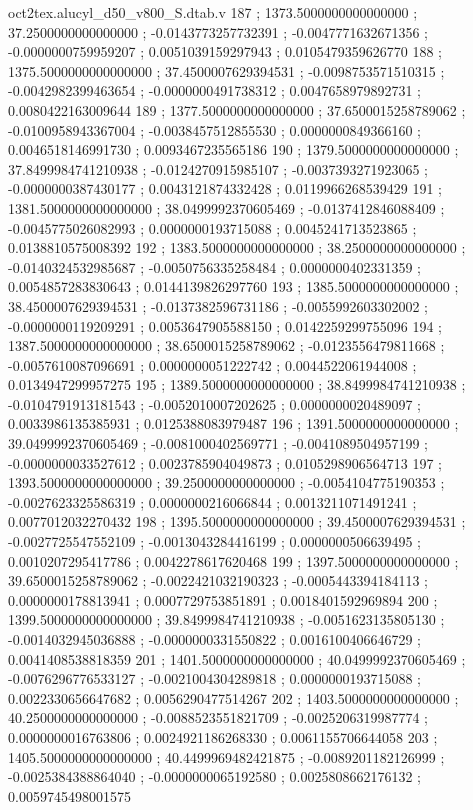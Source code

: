 \begin{filecontents}[overwrite]{oct2tex.alucyl_d50_v800_S.dtab.v}
187 ; 1373.5000000000000000 ; 37.2500000000000000 ; -0.0143773257732391 ; -0.0047771632671356 ; -0.0000000759959207 ; 0.0051039159297943 ; 0.0105479359626770
188 ; 1375.5000000000000000 ; 37.4500007629394531 ; -0.0098753571510315 ; -0.0042982399463654 ; -0.0000000491738312 ; 0.0047658979892731 ; 0.0080422163009644
189 ; 1377.5000000000000000 ; 37.6500015258789062 ; -0.0100958943367004 ; -0.0038457512855530 ; 0.0000000849366160 ; 0.0046518146991730 ; 0.0093467235565186
190 ; 1379.5000000000000000 ; 37.8499984741210938 ; -0.0124270915985107 ; -0.0037393271923065 ; -0.0000000387430177 ; 0.0043121874332428 ; 0.0119966268539429
191 ; 1381.5000000000000000 ; 38.0499992370605469 ; -0.0137412846088409 ; -0.0045775026082993 ; 0.0000000193715088 ; 0.0045241713523865 ; 0.0138810575008392
192 ; 1383.5000000000000000 ; 38.2500000000000000 ; -0.0140324532985687 ; -0.0050756335258484 ; 0.0000000402331359 ; 0.0054857283830643 ; 0.0144139826297760
193 ; 1385.5000000000000000 ; 38.4500007629394531 ; -0.0137382596731186 ; -0.0055992603302002 ; -0.0000000119209291 ; 0.0053647905588150 ; 0.0142259299755096
194 ; 1387.5000000000000000 ; 38.6500015258789062 ; -0.0123556479811668 ; -0.0057610087096691 ; 0.0000000051222742 ; 0.0044522061944008 ; 0.0134947299957275
195 ; 1389.5000000000000000 ; 38.8499984741210938 ; -0.0104791913181543 ; -0.0052010007202625 ; 0.0000000020489097 ; 0.0033986135385931 ; 0.0125388083979487
196 ; 1391.5000000000000000 ; 39.0499992370605469 ; -0.0081000402569771 ; -0.0041089504957199 ; -0.0000000033527612 ; 0.0023785904049873 ; 0.0105298906564713
197 ; 1393.5000000000000000 ; 39.2500000000000000 ; -0.0054104775190353 ; -0.0027623325586319 ; 0.0000000216066844 ; 0.0013211071491241 ; 0.0077012032270432
198 ; 1395.5000000000000000 ; 39.4500007629394531 ; -0.0027725547552109 ; -0.0013043284416199 ; 0.0000000506639495 ; 0.0010207295417786 ; 0.0042278617620468
199 ; 1397.5000000000000000 ; 39.6500015258789062 ; -0.0022421032190323 ; -0.0005443394184113 ; 0.0000000178813941 ; 0.0007729753851891 ; 0.0018401592969894
200 ; 1399.5000000000000000 ; 39.8499984741210938 ; -0.0051623135805130 ; -0.0014032945036888 ; -0.0000000331550822 ; 0.0016100406646729 ; 0.0041408538818359
201 ; 1401.5000000000000000 ; 40.0499992370605469 ; -0.0076296776533127 ; -0.0021004304289818 ; 0.0000000193715088 ; 0.0022330656647682 ; 0.0056290477514267
202 ; 1403.5000000000000000 ; 40.2500000000000000 ; -0.0088523551821709 ; -0.0025206319987774 ; 0.0000000016763806 ; 0.0024921186268330 ; 0.0061155706644058
203 ; 1405.5000000000000000 ; 40.4499969482421875 ; -0.0089201182126999 ; -0.0025384388864040 ; -0.0000000065192580 ; 0.0025808662176132 ; 0.0059745498001575

\end{filecontents}
